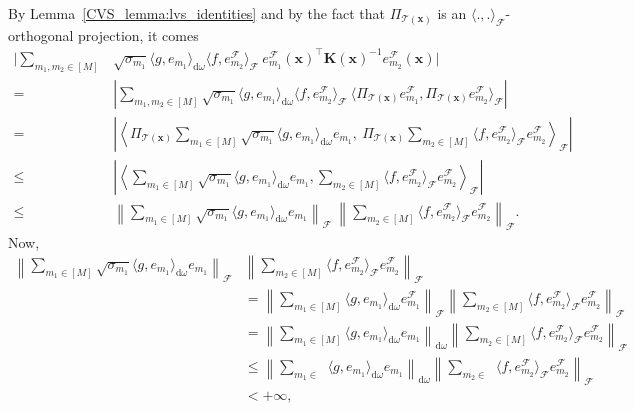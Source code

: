 \documentclass[twoside,11pt]{book}
\numberwithin{theorem}{chapter}
\numberwithin{definition}{chapter}
\numberwithin{proposition}{chapter}
\numberwithin{corollary}{chapter}
\numberwithin{example}{chapter}
\numberwithin{lemma}{chapter}
\numberwithin{assumption}{chapter}
\numberwithin{equation}{chapter}
\numberwithin{figure}{chapter}
\DeclareMathOperator{\Tran}{\intercal}
\DeclareMathOperator{\F}{\mathcal{F}}
\DeclareMathOperator{\Ns}{\mathbb{N}^{*}}
\begin{document}
By Lemma~\ref{CVS_lemma:lvs_identities} and by the fact that $\Pi_{\mathcal{T}(\bm{x})}$ is an $\langle.,.\rangle_{\F}$-orthogonal projection, it comes
\begin{align}
\Bigg|\sum_{m_{1}, m_2 \in [M]} &\sqrt{\sigma_{m_{1}}} \langle g, e_{m_{1}} \rangle_{\mathrm{d}\omega} \langle f, e_{m_{2}}^{\F} \rangle_{\F}  \: e_{m_{1}}^{\F}(\bm{x})^{\Tran} \bm{K}(\bm{x})^{-1}e_{m_{2}}^{\F}(\bm{x}) \Bigg| \\
= & \left|\sum_{m_{1}, m_2 \in [M]} \sqrt{\sigma_{m_{1}}} \langle g, e_{m_{1}} \rangle_{\mathrm{d}\omega}  \langle f, e_{m_{2}}^{\F} \rangle_{\F}  \: \langle \Pi_{\mathcal{T}(\bm{x})}e_{m_{1}}^{\F}, \Pi_{\mathcal{T}(\bm{x})}e_{m_{2}}^{\F} \rangle_{\F} \right|\\
= & \left| \left\langle \Pi_{\mathcal{T}(\bm{x})} \sum\limits_{m_{1} \in [M] }  \sqrt{\sigma_{m_{1}}} \langle g, e_{m_{1}} \rangle_{\mathrm{d}\omega}   e_{m_{1}},\:  \Pi_{\mathcal{T}(\bm{x})} \sum\limits_{m_{2} \in [M]} \langle f, e_{m_{2}}^{\F} \rangle_{\F} e_{m_{2}}^{\F} \right\rangle_{\F} \right|\\
\leq & \left| \left\langle \sum\limits_{m_{1} \in [M] }  \sqrt{\sigma_{m_{1}}} \langle g, e_{m_{1}} \rangle_{\mathrm{d}\omega}   e_{m_{1}},  \sum\limits_{m_{2} \in [M]} \langle f, e_{m_{2}}^{\F} \rangle_{\F} e_{m_{2}}^{\F} \right\rangle_{\F} \right|\\
\leq & \left\| \sum\limits_{m_{1} \in [M] }  \sqrt{\sigma_{m_{1}}} \langle g, e_{m_{1}} \rangle_{\mathrm{d}\omega}   e_{m_{1}} \right\|_{\F}\: \left \| \sum\limits_{m_{2} \in [M]} \langle f, e_{m_{2}}^{\F} \rangle_{\F} e_{m_{2}}^{\F} \right\|_{\F}.
\end{align}
Now,
\begin{align}
\left\| \sum\limits_{m_{1} \in [M] }  \sqrt{\sigma_{m_{1}}} \langle g, e_{m_{1}} \rangle_{\mathrm{d}\omega}   e_{m_{1}} \right\|_{\F}  & \left \| \sum\limits_{m_{2} \in [M]} \langle f, e_{m_{2}}^{\F} \rangle_{\F} e_{m_{2}}^{\F} \right\|_{\F}\\
&  = \left\| \sum\limits_{m_{1} \in [M] }  \langle g, e_{m_{1}} \rangle_{\mathrm{d}\omega}   e_{m_{1}}^{\F} \right\|_{\F} \left \| \sum\limits_{m_{2} \in [M]} \langle f, e_{m_{2}}^{\F} \rangle_{\F} e_{m_{2}}^{\F} \right\|_{\F}\\
&  = \left\| \sum\limits_{m_{1} \in [M] }  \langle g, e_{m_{1}} \rangle_{\mathrm{d}\omega}   e_{m_{1}} \right\|_{\mathrm{d}\omega} \left \| \sum\limits_{m_{2} \in [M]} \langle f, e_{m_{2}}^{\F} \rangle_{\F} e_{m_{2}}^{\F} \right\|_{\F}\\
&  \leq \left\| \sum\limits_{m_{1} \in \Ns }  \langle g, e_{m_{1}} \rangle_{\mathrm{d}\omega}   e_{m_{1}} \right\|_{\mathrm{d}\omega} \left \| \sum\limits_{m_{2} \in \Ns} \langle f, e_{m_{2}}^{\F} \rangle_{\F} e_{m_{2}}^{\F} \right\|_{\F}\\
& < +\infty,
\end{align}
\end{document}
